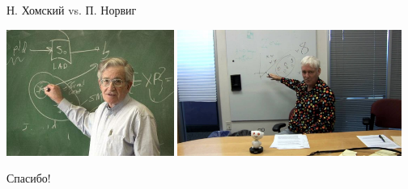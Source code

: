 \documentclass{beamer}
\begin{document}
\begin{frame}{Н. Хомский vs. П. Норвиг}
\begin{center}
        \includegraphics[width=0.41\textwidth]{chomsky.jpg}
        \hfill
        \includegraphics[width=0.55\textwidth]{norvig.jpg}
\end{center}
\end{frame}


\begin{frame}{}
    \thispagestyle{empty}
    \begin{center}
        {\large Спасибо!}
    \end{center}
\end{frame}
\end{document}
